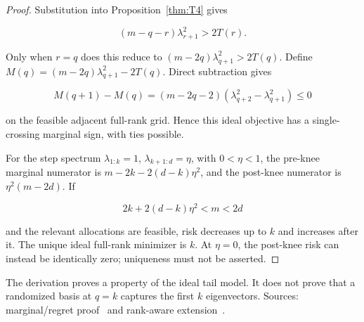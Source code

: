 \begin{proof}
Substitution into Proposition~\ref{thm:T4} gives


\begin{equation}
\boxed{(m-q-r)\lambda_{r+1}^2>2T(r).}
\end{equation}


Only when $r=q$ does this reduce to $(m-2q)\lambda_{q+1}^2>2T(q)$. Define $M(q)=(m-2q)\lambda_{q+1}^2-2T(q)$. Direct subtraction gives


\begin{equation}
M(q+1)-M(q)=(m-2q-2)(\lambda_{q+2}^2-\lambda_{q+1}^2)\le0
\end{equation}


on the feasible adjacent full-rank grid. Hence this ideal objective has a single-crossing marginal sign, with ties possible.


For the step spectrum $\lambda_{1:k}=1$, $\lambda_{k+1:d}=\eta$, with $0<\eta<1$, the pre-knee marginal numerator is $m-2k-2(d-k)\eta^2$, and the post-knee numerator is $\eta^2(m-2d)$. If


\begin{equation}
2k+2(d-k)\eta^2<m<2d
\end{equation}


and the relevant allocations are feasible, risk decreases up to $k$ and increases after it. The unique ideal full-rank minimizer is $k$. At $\eta=0$, the post-knee risk can instead be identically zero; uniqueness must not be asserted.

\end{proof}


The derivation proves a property of the ideal tail model. It does not prove that a randomized basis at $q=k$ captures the first $k$ eigenvectors. Sources: marginal/regret proof~\cite{project2026} and rank-aware extension~\cite{project2026}.

